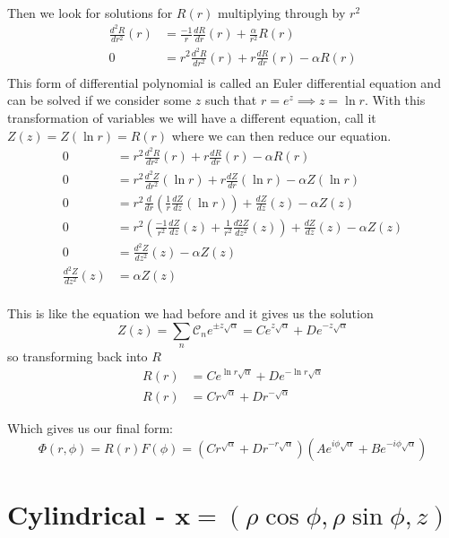 \documentclass{article}	%
\theoremstyle{definition}
\begin{document}
\paragraph{}
Then we look for solutions for $R(r)$ multiplying through by $r^{2}$
\begin{align*}
\frac{d^{2} R}{dr^{2}}(r) &= \frac{-1}{r} \frac{dR}{dr}(r) + \frac{\alpha}{r^{2}} R(r)\\
0 &= r^{2}\frac{d^{2} R}{dr^{2}}(r) +r \frac{dR}{dr}(r) -\alpha R(r)\\
\end{align*}
This form of differential polynomial is called an Euler differential equation and can be solved if we consider some $z$ such that $r=e^{z}\implies z=\ln r$. With this transformation of variables we will have a different equation, call it $Z(z)=Z(\ln r)=R(r)$ where we can then reduce our equation.
\begin{align*}
0 &= r^{2}\frac{d^{2} R}{dr^{2}}(r) +r \frac{dR}{dr}(r) -\alpha R(r)\\
0 &= r^{2}\frac{d^{2} Z}{dr^{2}}(\ln r) +r \frac{dZ}{dr}(\ln r) -\alpha Z(\ln r)\\
0 &= r^{2}\frac{d}{dr}\left( \frac{1}{r} \frac{dZ}{dz}(\ln r) \right) +\frac{dZ}{dz}(z) -\alpha Z(z)\\
0 &= r^{2}\left( \frac{-1}{r^{2}} \frac{dZ}{dz}(z) +\frac{1}{r^{2}} \frac{d{2} Z}{dz^{2}}(z) \right) +\frac{dZ}{dz}(z) -\alpha Z(z)\\
0 &= \frac{d^{2} Z}{dz^{2}}(z) -\alpha Z(z)\\
\frac{d^{2} Z}{dz^{2}}(z) &= \alpha Z(z)\\
\end{align*}

This is like the equation we had before and it gives us the solution
\[ Z(z) = \sum_{n} \mathcal{C}_{n}e^{\pm z\sqrt{\alpha}} = Ce^{z\sqrt{\alpha}} + De^{-z\sqrt{\alpha}} \]
so transforming back into $R$
\begin{align*}
R(r) &= Ce^{\ln r\sqrt{\alpha}} + De^{-\ln r\sqrt{\alpha}}\\
R(r) &= Cr^{\sqrt{\alpha}} + Dr^{-\sqrt{\alpha}}
\end{align*}

Which gives us our final form:
\[ \Phi (r,\phi) = R(r)F(\phi) = \left( Cr^{\sqrt{\alpha}} + Dr^{-r\sqrt{\alpha}} \right) \left( Ae^{i\phi\sqrt{\alpha}} + Be^{-i\phi\sqrt{\alpha}} \right) \]

\section{Cylindrical - $\mathbf{x}=(\rho\cos\phi,\rho\sin\phi,z)$}
\end{document}
